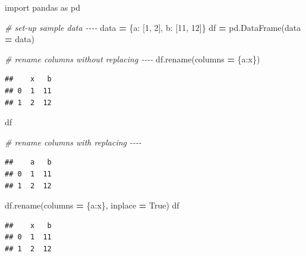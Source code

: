 \documentclass[
]{krantz}
\makeatletter
\newenvironment{Shaded}{\begin{snugshade}}{\end{snugshade}}
\newcommand{\CommentTok}[1]{\textcolor[rgb]{0.37,0.37,0.37}{\textit{#1}}}
\newcommand{\DecValTok}[1]{\textcolor[rgb]{0.06,0.06,0.06}{#1}}
\newcommand{\ImportTok}[1]{#1}
\newcommand{\NormalTok}[1]{#1}
\newcommand{\OperatorTok}[1]{\textcolor[rgb]{0.43,0.43,0.43}{\textbf{#1}}}
\newcommand{\StringTok}[1]{\textcolor[rgb]{0.5,0.5,0.5}{#1}}
\newcommand{\VariableTok}[1]{\textcolor[rgb]{0,0,0}{#1}}
\newenvironment{kframe}{%
\medskip{}
\setlength{\fboxsep}{.8em}
 \def\at@end@of@kframe{}%
 \ifinner\ifhmode%
  \def\at@end@of@kframe{\end{minipage}}%
  \begin{minipage}{\columnwidth}%
 \fi\fi%
 \def\FrameCommand##1{\hskip\@totalleftmargin \hskip-\fboxsep
 \colorbox{shadecolor}{##1}\hskip-\fboxsep
     \hskip-\linewidth \hskip-\@totalleftmargin \hskip\columnwidth}%
 \MakeFramed {\advance\hsize-\width
   \@totalleftmargin\z@ \linewidth\hsize
   \@setminipage}}%
 {\par\unskip\endMakeFramed%
 \at@end@of@kframe}
\renewenvironment{Shaded}{\begin{kframe}}{\end{kframe}}
\makeatother
\begin{document}
\begin{Shaded}
\begin{Highlighting}[]
\ImportTok{import}\NormalTok{ pandas }\ImportTok{as}\NormalTok{ pd}

\CommentTok{\# set{-}up sample data {-}{-}{-}{-}}
\NormalTok{data }\OperatorTok{=}\NormalTok{ \{}\StringTok{\textquotesingle{}a\textquotesingle{}}\NormalTok{: [}\DecValTok{1}\NormalTok{, }\DecValTok{2}\NormalTok{], }
        \StringTok{\textquotesingle{}b\textquotesingle{}}\NormalTok{: [}\DecValTok{11}\NormalTok{, }\DecValTok{12}\NormalTok{]\}}
\NormalTok{df }\OperatorTok{=}\NormalTok{ pd.DataFrame(data }\OperatorTok{=}\NormalTok{ data)}

\CommentTok{\# rename columns without replacing {-}{-}{-}{-}}
\NormalTok{df.rename(columns }\OperatorTok{=}\NormalTok{ \{}\StringTok{\textquotesingle{}a\textquotesingle{}}\NormalTok{:}\StringTok{\textquotesingle{}x\textquotesingle{}}\NormalTok{\})}
\end{Highlighting}
\end{Shaded}

\begin{verbatim}
##    x   b
## 0  1  11
## 1  2  12
\end{verbatim}

\begin{Shaded}
\begin{Highlighting}[]
\NormalTok{df}

\CommentTok{\# rename columns with replacing {-}{-}{-}{-}}
\end{Highlighting}
\end{Shaded}

\begin{verbatim}
##    a   b
## 0  1  11
## 1  2  12
\end{verbatim}

\begin{Shaded}
\begin{Highlighting}[]
\NormalTok{df.rename(columns }\OperatorTok{=}\NormalTok{ \{}\StringTok{\textquotesingle{}a\textquotesingle{}}\NormalTok{:}\StringTok{\textquotesingle{}x\textquotesingle{}}\NormalTok{\}, inplace }\OperatorTok{=} \VariableTok{True}\NormalTok{)}
\NormalTok{df}
\end{Highlighting}
\end{Shaded}

\begin{verbatim}
##    x   b
## 0  1  11
## 1  2  12
\end{verbatim}
\end{document}
